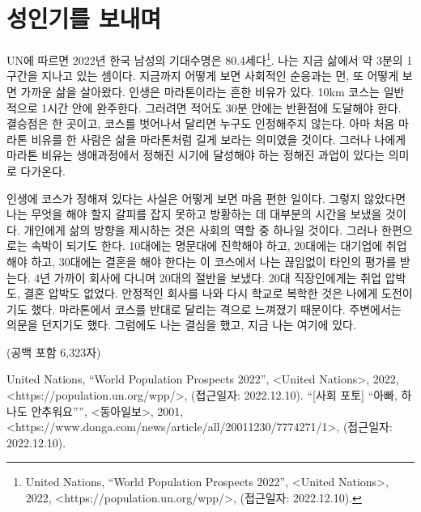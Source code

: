 \section*{성인기를 보내며}

UN에 따르면 2022년 한국 남성의 기대수명은 80.4세다\footnote{United Nations, ``World Population Prospects 2022'', <United Nations>, 2022, <https://population.un.org/wpp/>, (접근일자: 2022.12.10).}. 나는 지금 삶에서 약 3분의 1구간을 지나고 있는 셈이다. 지금까지 어떻게 보면 사회적인 순응과는 먼, 또 어떻게 보면 가까운 삶을 살아왔다. 인생은 마라톤이라는 흔한 비유가 있다. 10km 코스는 일반적으로 1시간 안에 완주한다. 그러려면 적어도 30분 안에는 반환점에 도달해야 한다. 결승점은 한 곳이고, 코스를 벗어나서 달리면 누구도 인정해주지 않는다. 아마 처음 마라톤 비유를 한 사람은 삶을 마라톤처럼 길게 보라는 의미였을 것이다. 그러나 나에게 마라톤 비유는 생애과정에서 정해진 시기에 달성해야 하는 정해진 과업이 있다는 의미로 다가온다.

인생에 코스가 정해져 있다는 사실은 어떻게 보면 마음 편한 일이다. 그렇지 않았다면 나는 무엇을 해야 할지 갈피를 잡지 못하고 방황하는 데 대부분의 시간을 보냈을 것이다. 개인에게 삶의 방향을 제시하는 것은 사회의 역할 중 하나일 것이다. 그러나 한편으로는 속박이 되기도 한다. 10대에는 명문대에 진학해야 하고, 20대에는 대기업에 취업해야 하고, 30대에는 결혼을 해야 한다는 이 코스에서 나는 끊임없이 타인의 평가를 받는다. 4년 가까이 회사에 다니며 20대의 절반을 보냈다. 20대 직장인에게는 취업 압박도, 결혼 압박도 없었다. 안정적인 회사를 나와 다시 학교로 복학한 것은 나에게 도전이기도 했다. 마라톤에서 코스를 반대로 달리는 격으로 느껴졌기 때문이다. 주변에서는 의문을 던지기도 했다. 그럼에도 나는 결심을 했고, 지금 나는 여기에 있다.

\begin{flushright}
  (공백 포함 6,323자)
\end{flushright}

\begin{thebibliography}{9}
   United Nations, ``World Population Prospects 2022'', <United Nations>, 2022, <https://population.un.org/wpp/>, (접근일자: 2022.12.10).
   ``[사회 포토] ``아빠, 하나도 안추워요'''', <동아일보>, 2001, <https://www.donga.com/news/article/all/20011230/7774271/1>, (접근일자: 2022.12.10).
\end{thebibliography}
